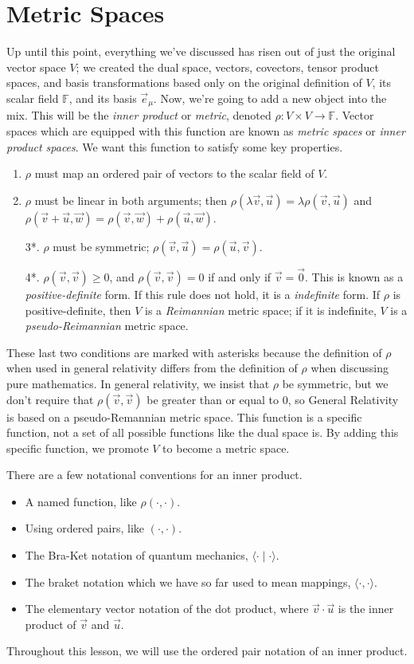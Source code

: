 \chapter{Metric Spaces}
Up until this point, everything we've discussed has risen out of just the original vector space $V$; we created the dual space, vectors, covectors, tensor product spaces, and basis transformations based only on the original definition of $V$, its scalar field $\mathbb{F}$, and its basis $\vec{e}_\mu$.
Now, we're going to add a new object into the mix.
This will be the \emph{inner product} or \emph{metric}, denoted $\rho: V \times V \to \mathbb{F}$.
Vector spaces which are equipped with this function are known as \emph{metric spaces} or \emph{inner product spaces}. 
We want this function to satisfy some key properties.
\begin{enumerate}
    \item $\rho$ must map an ordered pair of vectors to the scalar field of $V$.
    \item $\rho$ must be linear in both arguments; then $\rho(\lambda\vec{v},\vec{u}) = \lambda \rho(\vec{v},\vec{u})$ and $\rho(\vec{v} + \vec{u},\vec{w}) = \rho(\vec{v},\vec{w}) + \rho(\vec{u},\vec{w})$.
    \item[3*.] $\rho$ must be symmetric; $\rho(\vec{v},\vec
    u) = \rho(\vec{u},\vec{v})$.
    \item[4*.] $\rho(\vec{v},\vec{v}) \geq 0$, and $\rho(\vec{v},\vec{v}) = 0$ if and only if $\vec{v} = \vec{0}$. This is known as a \emph{positive-definite} form. If this rule does not hold, it is a \emph{indefinite} form.
    If $\rho$ is positive-definite, then $V$ is a \emph{Reimannian} metric space; if it is indefinite, $V$ is a \emph{pseudo-Reimannian} metric space.
\end{enumerate}
These last two conditions are marked with asterisks because the definition of $\rho$ when used in general relativity differs from the definition of $\rho$ when discussing pure mathematics.
In general relativity, we insist that $\rho$ be symmetric, but we don't require that $\rho(\vec{v},\vec{v})$ be greater than or equal to 0, so General Relativity is based on a pseudo-Remannian metric space.
This function is a specific function, not a set of all possible functions like the dual space is.
By adding this specific function, we promote $V$ to become a metric space.

There are a few notational conventions for an inner product.
\begin{itemize}
    \item A named function, like $\rho(\cdot,\cdot)$.
    \item Using ordered pairs, like $(\cdot, \cdot)$.
    \item The Bra-Ket notation of quantum mechanics, $\langle \cdot \mid \cdot \rangle$.
    \item The braket notation which we have so far used to mean mappings, $\langle \cdot, \cdot \rangle$.
    \item The elementary vector notation of the dot product, where $\vec{v}\cdot\vec{u}$ is the inner product of $\vec{v}$ and $\vec{u}$.
\end{itemize}
Throughout this lesson, we will use the ordered pair notation of an inner product.

